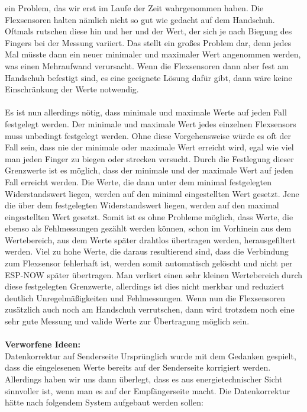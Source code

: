 \documentclass[11pt]{article}
\begin{document}
ein Problem, das wir erst im Laufe der Zeit wahrgenommen haben. Die Flexsensoren halten nämlich nicht so gut wie gedacht auf 
dem Handschuh. Oftmals rutschen diese hin und her und der Wert, der sich je nach Biegung des Fingers bei der Messung variiert. 
Das stellt ein großes Problem dar, denn jedes Mal müsste dann ein neuer minimaler und maximaler Wert angenommen werden, was 
einen Mehraufwand verursacht. Wenn die Flexsensoren dann aber fest am Handschuh befestigt sind, es eine geeignete Lösung dafür 
gibt, dann wäre keine Einschränkung der Werte notwendig. \\
\\
Es ist nun allerdings nötig, dass minimale und maximale Werte auf jeden Fall festgelegt werden. Der minimale und maximale Wert 
jedes einzelnen Flexsensors muss unbedingt festgelegt werden. Ohne diese Vorgehensweise würde es oft der Fall sein, dass nie 
der minimale oder maximale Wert erreicht wird, egal wie viel man jeden Finger zu biegen oder strecken versucht. Durch die 
Festlegung dieser Grenzwerte ist es möglich, dass der minimale und der maximale Wert auf jeden Fall erreicht werden. Die Werte, 
die dann unter dem minimal festgelegten Widerstandswert liegen, werden auf den minimal eingestellten Wert gesetzt. Jene die 
über dem festgelegten Widerstandswert liegen, werden auf den maximal eingestellten Wert gesetzt. Somit ist es ohne Probleme 
möglich, dass Werte, die ebenso als Fehlmessungen gezählt werden können, schon im Vorhinein aus dem Wertebereich, aus dem Werte 
später drahtlos übertragen werden, herausgefiltert werden. Viel zu hohe Werte, die daraus resultierend sind, dass die Verbindung 
zum Flexsensor fehlerhaft ist, werden somit automatisch gelöscht und nicht per ESP-NOW später übertragen. Man verliert einen 
sehr kleinen Wertebereich durch diese festgelegten Grenzwerte, allerdings ist dies nicht merkbar und reduziert deutlich 
Unregelmäßigkeiten und Fehlmessungen. Wenn nun die Flexsensoren zusätzlich auch noch am Handschuh verrutschen, dann wird 
trotzdem noch eine sehr gute Messung und valide Werte zur Übertragung möglich sein. \\
\\
\textbf{Verworfene Ideen:}
\\
Datenkorrektur auf Senderseite
Ursprünglich wurde mit dem Gedanken gespielt, dass die eingelesenen Werte bereits auf der Senderseite korrigiert werden. 
Allerdings haben wir uns dann überlegt, dass es aus energietechnischer Sicht sinnvoller ist, wenn man es auf der Empfängerseite 
macht. Die Datenkorrektur hätte nach folgendem System aufgebaut werden sollen: \\
\end{document}

